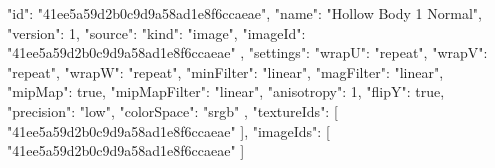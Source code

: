 {
  "id": "41ee5a59d2b0c9d9a58ad1e8f6ccaeae",
  "name": "Hollow Body 1 Normal",
  "version": 1,
  "source": {
    "kind": "image",
    "imageId": "41ee5a59d2b0c9d9a58ad1e8f6ccaeae"
  },
  "settings": {
    "wrapU": "repeat",
    "wrapV": "repeat",
    "wrapW": "repeat",
    "minFilter": "linear",
    "magFilter": "linear",
    "mipMap": true,
    "mipMapFilter": "linear",
    "anisotropy": 1,
    "flipY": true,
    "precision": "low",
    "colorSpace": "srgb"
  },
  "textureIds": [
    "41ee5a59d2b0c9d9a58ad1e8f6ccaeae"
  ],
  "imageIds": [
    "41ee5a59d2b0c9d9a58ad1e8f6ccaeae"
  ]
}
